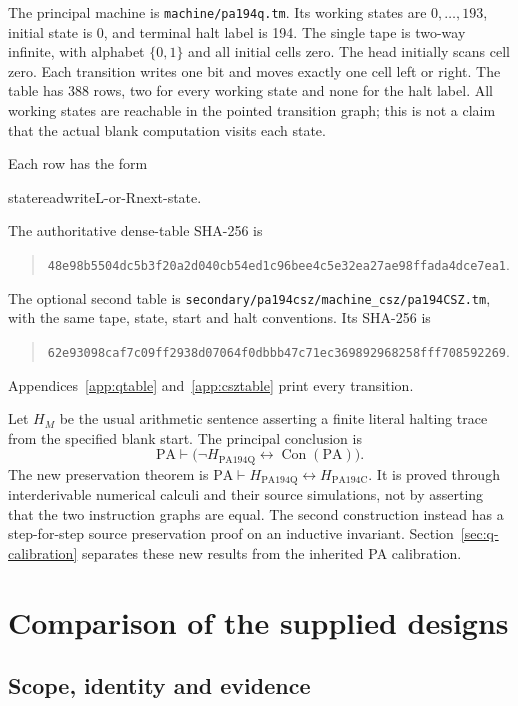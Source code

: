 \documentclass[11pt,letterpaper]{article}
\newcommand{\PA}{\mathrm{PA}}
\newcommand{\Con}{\operatorname{Con}}
\newcommand{\file}[1]{\texttt{\nolinkurl{#1}}}
\begin{document}
The principal machine is \file{machine/pa194q.tm}. Its working states are
$0,\ldots,193$, initial state is 0, and terminal halt label is 194.
The single tape is two-way infinite, with alphabet $\{0,1\}$ and all
initial cells zero. The head initially scans cell zero. Each transition
writes one bit and moves exactly one cell left or right. The table has
388 rows, two for every working state and none for the halt label.
All working states are reachable in the pointed transition graph; this
is not a claim that the actual blank computation visits each state.

Each row has the form
\begin{center}\ttfamily state\quad read\quad write\quad L-or-R\quad next-state.\end{center}
The authoritative dense-table SHA-256 is
\begin{quote}\small
\nolinkurl{48e98b5504dc5b3f20a2d040cb54ed1c96bee4c5e32ea27ae98ffada4dce7ea1}.
\end{quote}
The optional second table is
\file{secondary/pa194csz/machine_csz/pa194CSZ.tm}, with the same tape,
state, start and halt conventions. Its SHA-256 is
\begin{quote}\small
\nolinkurl{62e93098caf7c09ff2938d07064f0dbbb47c71ec369892968258fff708592269}.
\end{quote}
Appendices~\ref{app:qtable} and~\ref{app:csztable} print every transition.

Let $H_M$ be the usual arithmetic sentence asserting a finite literal
halting trace from the specified blank start. The principal conclusion is
\[
 \PA\vdash\bigl(\neg H_{\mathrm{PA194Q}}
                         \leftrightarrow\Con(\PA)\bigr).
\]
The new preservation theorem is
$\PA\vdash H_{\mathrm{PA194Q}}\leftrightarrow H_{\mathrm{PA194C}}$.
It is proved through interderivable numerical calculi and their source
simulations, not by asserting that the two instruction graphs are equal.
The second construction instead has a step-for-step source preservation
proof on an inductive invariant. Section~\ref{sec:q-calibration} separates
these new results from the inherited PA calibration.

\section{Comparison of the supplied designs}

\subsection{Scope, identity and evidence}
\end{document}
